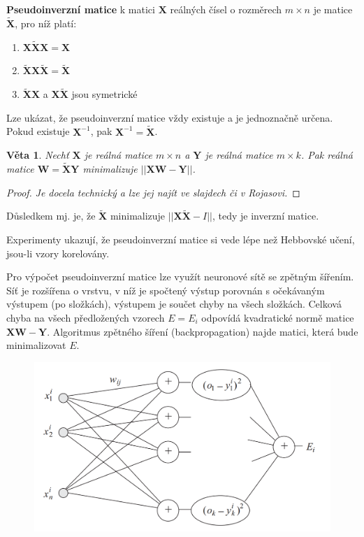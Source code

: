 \documentclass[11pt]{report} %
\renewcommand{\vec}[1]{\mathbf{#1}}
\newtheorem{theorem}{Věta}[section]
\numberwithin{equation}{section}
\begin{document}
\textbf{Pseudoinverzní matice} k matici $\vec{X}$ reálných čísel o rozměrech $m \times n$ je matice $\vec{\tilde{X}}$, pro níž platí:
\begin{enumerate}
	
	
	\item $\vec{X}\vec{\tilde{X}}\vec{X} = \vec{X}$
	\item $\vec{\tilde{X}}\vec{X}\vec{\tilde{X}} = \vec{\tilde{X}}$
	\item $\vec{\tilde{X}}\vec{X}$ a $\vec{X}\vec{\tilde{X}}$ jsou symetrické
\end{enumerate}
Lze ukázat, že pseudoinverzní matice vždy existuje a je jednoznačně určena. Pokud existuje $\vec{X}^{-1}$, pak $\vec{X}^{-1} = \vec{\tilde{X}}$. 

\begin{theorem}
	Nechť $\vec{X}$ je reálná matice $m \times n$ a $\vec{Y}$ je reálná matice $m \times k$. Pak reálná matice $\vec{W} = \vec{\tilde{X}}\vec{Y}$ minimalizuje  $||\vec{X}\vec{W} - \vec{Y}||$.
\end{theorem}
\begin{proof}
\textit{Je docela technický a lze jej najít ve slajdech či v Rojasovi.}	
\end{proof}

Důsledkem mj. je, že $\vec{\tilde{X}}$ minimalizuje $||\vec{X}\vec{\tilde{X}} - I||$, tedy je  inverzní matice. 

Experimenty ukazují, že pseudoinverzní matice si vede lépe než Hebbovské učení, jsou-li vzory korelovány.

Pro výpočet pseudoinverzní matice lze využít neuronové sítě se zpětným šířením. Síť je rozšířena o vrstvu, v níž je spočtený výstup porovnán s očekávaným výstupem (po složkách), výstupem je součet chyby na všech složkách. Celková chyba na všech předložených vzorech $E = E_i$ odpovídá kvadratické normě matice $\vec{X}\vec{W} - \vec{Y}$. Algoritmus zpětného šíření (backpropagation) najde matici, která bude minimalizovat $E$.

\begin{figure}[H]
	\centering
	\includegraphics[scale=1]{img/pseudoinverse.png}
\end{figure}
\end{document}

